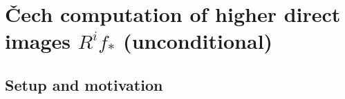 \chapter{{\v C}ech computation of higher direct images $R^i f_*$ (unconditional)}
\label{chap:Cohomology_CechHigherDirectImage}

\section{Setup and motivation}

